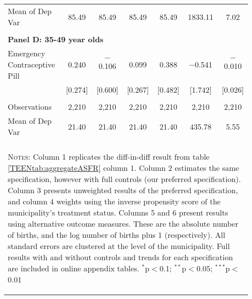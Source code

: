 \begin{landscape}
\begin{table}[!htbp]
\begin{tabular}{@{\extracolsep{5pt}}lcccccc}
Mean of Dep Var& 85.49 & 85.49 & 85.49 & 85.49 & 1833.11 & 7.02 \\
 & & & & & & \\ \multicolumn{7}{l}{\textbf{
\noindent Panel D: 35-49 year olds}} \\
Emergency Contraceptive Pill & 0.240 & $-$0.106 & 0.099 & 0.388 & $-$0.541 & $-$0.010 \\
& [0.274] & [0.600] & [0.267] & [0.482] & [1.742] & [0.026] \\
 & & & & & & \\
Observations& 2,210 & 2,210 & 2,210 & 2,210 & 2,210 & 2,210 \\
Mean of Dep Var& 21.40 & 21.40 & 21.40 & 21.40 & 435.78 & 5.55 \\
\hline \\[-1.8ex] 
\multicolumn{7}{p{17.6cm}}{\begin{footnotesize}          
\textsc{Notes:}                                           
Column 1 replicates the diff-in-diff result from table     
\ref{TEENtab:aggregateASFR} column 1.  Column 2 estimates 
the same specification, however with full controls (our    
preferred specification).  Column 3 presents unweighted    
results of the preferred specification, and column 4       
weights using the inverse propensity score of the          
municipality's treatment status.  Columns 5 and 6 present 
results using alternative outcome measures.  These are the 
absolute number of births, and the log number of births    
plus 1 (respectively).  All standard errors are clustered  
at the level of the municipality. Full results with and    
without controls and trends for each specification are     
included in online appendix tables.                        
$^{*}$p$<$0.1; $^{**}$p$<$0.05; $^{***}$p$<$0.01\end{footnotesize}}
\normalsize\end{tabular}\end{table}\end{landscape}
